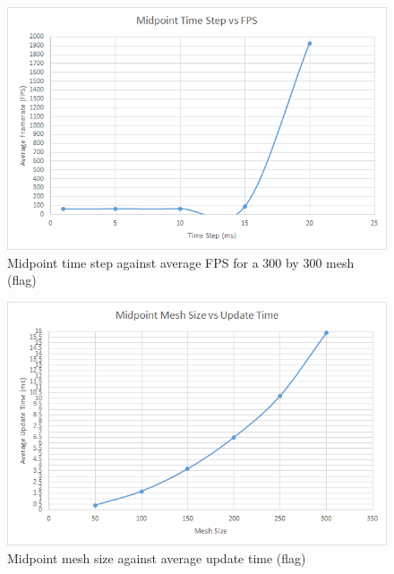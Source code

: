     \begin{figure}
    \begin{center}
      \includegraphics[scale=.9]{Figures/flag_m_ts_fps}
    \end{center}
    \caption{Midpoint time step against average FPS for a 300 by 300 mesh (flag)}
    \label{fig:m step fps flag}
  \end{figure}
  
    \begin{figure}
    \begin{center}
      \includegraphics[scale=.9]{Figures/flag_m_m_ut}
    \end{center}
    \caption{Midpoint mesh size against average update time (flag)}
    \label{fig:m mesh update flag}
  \end{figure}
  
